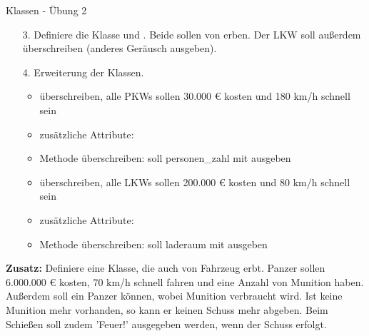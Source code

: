 \begin{frame}{Klassen - Übung 2}
	\begin{itemize}
		\item[3.] 
		Definiere die Klasse  und . Beide sollen von  erben.
		Der LKW soll außerdem  überschreiben (anderes Geräusch ausgeben).
		
		\item[4.] 
			Erweiterung der Klassen.\linebreak
			\begin{itemize}
				\item {} überschreiben, alle PKWs sollen 30.000 € kosten und 180 km/h schnell sein
				\item zusätzliche Attribute: 
				\item {} Methode überschreiben: soll personen\_zahl mit ausgeben
			\end{itemize}
		
			\begin{itemize}
				\item {} überschreiben, alle LKWs sollen 200.000 € kosten und 80 km/h schnell sein
				\item zusätzliche Attribute: 
				\item {} Methode überschreiben: soll laderaum mit ausgeben
			\end{itemize}
	\end{itemize}
\end{frame}

\begin{frame}
	\textbf{Zusatz:} Definiere eine  Klasse, die auch von Fahrzeug erbt. Panzer sollen 6.000.000 € kosten, 70 km/h schnell fahren und eine Anzahl von Munition haben. Außerdem soll ein Panzer  können, wobei Munition verbraucht wird. Ist keine Munition mehr vorhanden, so kann er keinen Schuss mehr abgeben. Beim Schießen soll zudem 'Feuer!' ausgegeben werden, wenn der Schuss erfolgt.
\end{frame}


